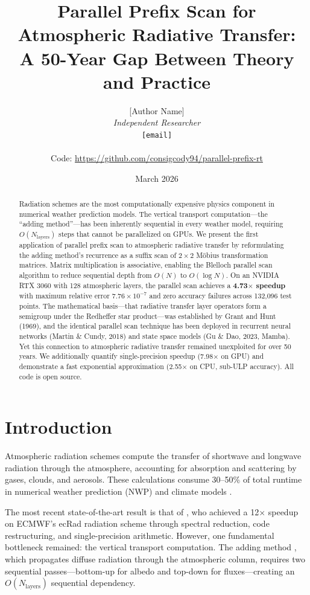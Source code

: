\documentclass[12pt,letterpaper]{article}
\title{Parallel Prefix Scan for Atmospheric Radiative Transfer:\\
A 50-Year Gap Between Theory and Practice}
\author{
  [Author Name]\\
  \textit{Independent Researcher}\\
  \texttt{[email]}\\
  \\
  Code: \url{https://github.com/consigcody94/parallel-prefix-rt}
}
\date{March 2026}
\begin{document}
\maketitle

\begin{abstract}
Radiation schemes are the most computationally expensive physics component in numerical weather prediction models. The vertical transport computation---the ``adding method''---has been inherently sequential in every weather model, requiring $O(N_{\text{layers}})$ steps that cannot be parallelized on GPUs. We present the first application of parallel prefix scan to atmospheric radiative transfer by reformulating the adding method's recurrence as a suffix scan of $2\times 2$ M\"{o}bius transformation matrices. Matrix multiplication is associative, enabling the Blelloch parallel scan algorithm to reduce sequential depth from $O(N)$ to $O(\log N)$. On an NVIDIA RTX 3060 with 128 atmospheric layers, the parallel scan achieves a \textbf{4.73$\times$ speedup} with maximum relative error $7.76 \times 10^{-7}$ and zero accuracy failures across 132,096 test points. The mathematical basis---that radiative transfer layer operators form a semigroup under the Redheffer star product---was established by Grant and Hunt (1969), and the identical parallel scan technique has been deployed in recurrent neural networks (Martin \& Cundy, 2018) and state space models (Gu \& Dao, 2023, Mamba). Yet this connection to atmospheric radiative transfer remained unexploited for over 50 years. We additionally quantify single-precision speedup (7.98$\times$ on GPU) and demonstrate a fast exponential approximation (2.55$\times$ on CPU, sub-ULP accuracy). All code is open source.
\end{abstract}

\section{Introduction}

Atmospheric radiation schemes compute the transfer of shortwave and longwave radiation through the atmosphere, accounting for absorption and scattering by gases, clouds, and aerosols. These calculations consume 30--50\% of total runtime in numerical weather prediction (NWP) and climate models \citep{pincus2019,ukkonen2024}.

The most recent state-of-the-art result is that of \citet{ukkonen2024}, who achieved a 12$\times$ speedup on ECMWF's ecRad radiation scheme through spectral reduction, code restructuring, and single-precision arithmetic. However, one fundamental bottleneck remained: the vertical transport computation. The adding method \citep{shonk2008}, which propagates diffuse radiation through the atmospheric column, requires two sequential passes---bottom-up for albedo and top-down for fluxes---creating an $O(N_{\text{layers}})$ sequential dependency.
\end{document}
